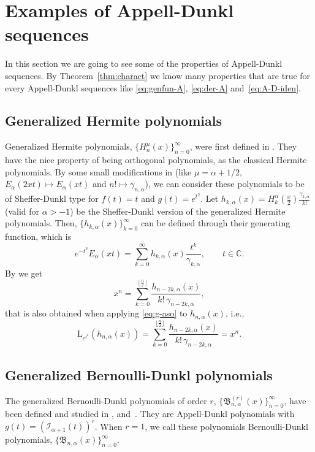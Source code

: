 \documentclass[11pt]{article}
\theoremstyle{plain}
\theoremstyle{remark}
\newtheorem{example}[theorem]{Example}
\numberwithin{equation}{section} %
\newcommand{\Ea}{E_{\alpha}}
\newcommand{\I}{\mathcal{I}}
\newcommand{\B}{\mathfrak{B}}
\newcommand{\CC}{\mathbb{C}}
\newcommand{\LL}{\mathrm{L}}
\begin{document}
\section{Examples of Appell-Dunkl sequences}
\label{sec:ex-appell}

In this section we are going to see some of the properties of Appell-Dunkl sequences. By Theorem~\ref{thm:charact} we know many properties that are true for every Appell-Dunkl sequences like \eqref{eq:genfun-A}, \eqref{eq:der-A} and~\eqref{eq:A-D-iden}.

\subsection{Generalized Hermite polynomials}

Generalized Hermite polynomials, $\{H^{\mu}_{n}(x)\}_{n=0}^\infty$, were first defined in \cite{Ros}. They have the nice property of being orthogonal polynomials, as the classical Hermite polynomials. By some small modifications in \cite[(2.5.8)]{Ros}  (like $\mu = \alpha + 1/2$, $\Ea(2xt) \mapsto \Ea(xt)$ and $n! \mapsto \gamma_{n,\alpha}$), we can consider these polynomials to be of Sheffer-Dunkl type for $f(t) = t$ and $g(t) = e^{t^2}$. Let $h_{k,\alpha}(x) = H^\alpha_{k}(\frac{x}{2})\frac{\gamma_{k,\alpha}}{k!}$ (valid for $\alpha > -1$) be the Sheffer-Dunkl version of the generalized Hermite polynomials. Then, $\{h_{k,\alpha}(x)\}_{k=0}^\infty$ can be defined through their generating function, which is
\[
e^{-t^2} \Ea(xt) = \sum_{k=0}^{\infty} h_{k,\alpha}(x) \frac{t^k}{\gamma_{k,\alpha}},
\qquad t \in \CC.
\]
By \cite[(2.6.7)]{Ros} we get
\[
x^n = \sum_{k=0}^{\lfloor \frac{n}{2} \rfloor} \frac{h_{n-2k,\alpha}(x)}{k! \,\gamma_{n-2k,\alpha}},
\]
that is also obtained when applying \eqref{eq:g-aso} to $h_{n,\alpha}(x)$, i.e.,
\[
\LL_{e^{t^2}}(h_{n,\alpha}(x)) 
= \sum_{k=0}^{\lfloor \frac{n}{2} \rfloor} \frac{h_{n-2k,\alpha}(x)}{k! \,\gamma_{n-2k,\alpha}} = x^n.
\]

\subsection{Generalized Bernoulli-Dunkl polynomials}

The generalized Bernoulli-Dunkl polynomials of order $r$, $\{\B^{(r)}_{n,\alpha}(x)\}_{n=0}^\infty$, have been defined and studied in \cite{CDPV}, \cite{CMV} and~\cite{MV}. They are Appell-Dunkl polynomials with $g(t) = (\I_{\alpha+1}(t))^r$. When $r=1$, we call these polynomials Bernoulli-Dunkl polynomials, $\{\B_{n,\alpha}(x)\}_{n=0}^\infty$.
\end{document}
